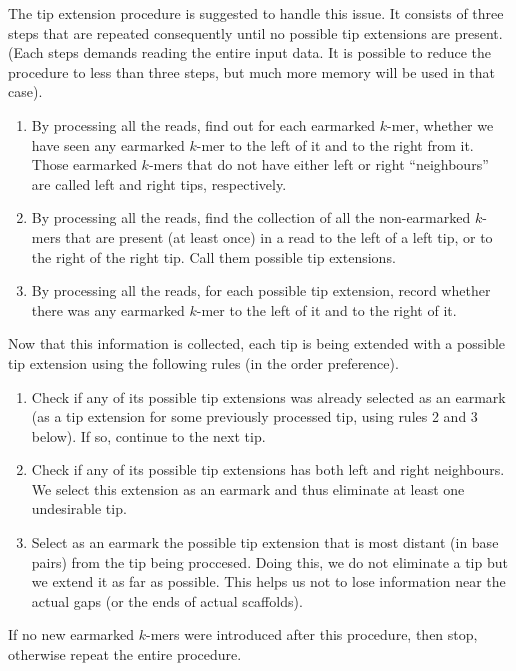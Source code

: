 \documentclass[12pt]{article}
\begin{document}
The tip extension procedure is suggested to handle this issue.
It consists of three steps that are repeated consequently until no possible tip extensions are present.
(Each steps demands reading the entire input data. It is possible to reduce the procedure to less than three
steps, but much more memory will be used in that case).

\begin{enumerate}
\item By processing all the reads, find out for each earmarked $k$-mer, whether we have seen any
earmarked $k$-mer to the left of it and to the right from it.
Those earmarked $k$-mers that do not have either left or right ``neighbours'' are called left and right tips,
respectively.
\item By processing all the reads, find the collection of all the non-earmarked $k$-mers that
are present (at least once) in a read to the left of a left tip, or to the right of the right tip.
Call them possible tip extensions.
\item By processing all the reads, for each possible tip extension, record whether there was
any earmarked $k$-mer to the left of it and to the right of it.
\end{enumerate}

Now that this information is collected, each tip is being extended with
a possible tip extension using the following rules (in the order preference).

\begin{enumerate}
\item Check if any of its possible tip extensions was already selected as an earmark
(as a tip extension for some previously processed tip, using rules 2 and 3 below).
If so, continue to the next tip.
\item Check if any of its possible tip extensions has both left and right neighbours.
We select this extension as an earmark and thus eliminate at least one undesirable tip.
\item Select as an earmark the possible tip extension that is most distant (in base pairs)
from the tip being proccesed. Doing this, we do not eliminate a tip but we extend it as far
as possible. This helps us not to lose information near the actual gaps (or the ends of actual scaffolds).
{}
\end{enumerate}

If no new earmarked $k$-mers were introduced after this procedure, then stop, otherwise repeat the entire procedure.
\end{document}
